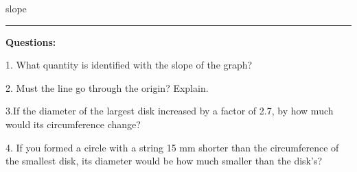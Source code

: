 \vspace{10pt}

slope \rule{1.5in}{0.2pt}

\vspace{10pt}

{\noindent \bf Questions:}

1. What quantity is identified with the slope of the graph? 
\vspace{10mm}

2. Must the line go through the origin? Explain. 
\vspace{20mm}

3.If the diameter of the largest disk increased by a factor of 2.7, by how much
would its circumference change? 
\vspace{20mm}

4. If you formed a circle with a string 15 mm shorter than the circumference
of the smallest disk, its diameter would be how much smaller than the disk's?

